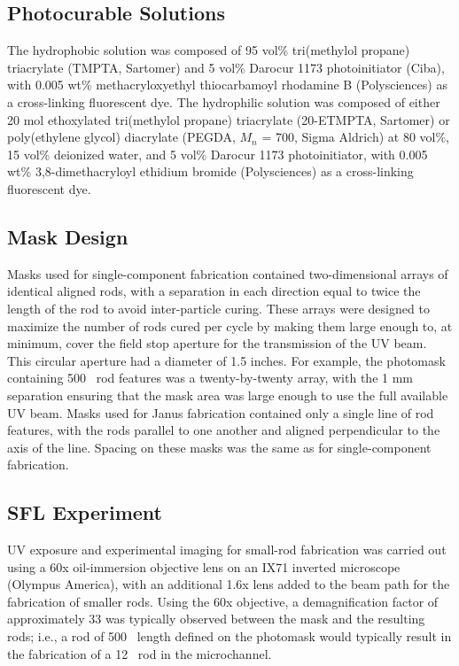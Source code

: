 \subsection{Photocurable Solutions}
\label{sec:janus-materials}
The hydrophobic solution was composed of 95 vol\% 
tri(methylol propane) triacrylate (TMPTA, Sartomer) and 5 vol\% Darocur 1173 photoinitiator (Ciba), 
with 0.005 wt\% methacryloxyethyl thiocarbamoyl rhodamine B (Polysciences) as a cross-linking 
fluorescent dye.
The hydrophilic solution was composed of either 20 mol ethoxylated tri(methylol propane) triacrylate (20-ETMPTA,
Sartomer) or poly(ethylene glycol) diacrylate (PEGDA, $M_n$ = 700, Sigma Aldrich) at 80 vol\%, 
15 vol\% deionized water, and 5 vol\% Darocur 1173 photoinitiator, with 0.005 wt\% 
3,8-dimethacryloyl ethidium bromide (Polysciences) as a cross-linking fluorescent dye.


\subsection{Mask Design}

Masks used for single-component fabrication contained two-dimensional arrays of identical aligned 
rods, with a separation in each direction equal to twice the length of the rod to avoid inter-particle
curing. These arrays were designed to maximize the number of 
rods cured per cycle by making them large enough to, at minimum,
cover the field stop aperture for the transmission of the UV beam. This circular aperture 
had a diameter of 1.5 inches.  For example, the photomask containing 500 \microns~rod features
was a twenty-by-twenty array, with the 1 mm separation ensuring that the mask area was large enough to
use the full available UV beam.  
Masks used for Janus fabrication contained only a single line of rod features, with the rods parallel to one 
another and aligned perpendicular to the axis of the line.  Spacing on these 
masks was the same as for single-component fabrication.


\subsection{SFL Experiment}
\label{sec:sfl-expt-rods}

UV exposure and experimental imaging for small-rod fabrication was carried out using a 60x 
oil-immersion objective lens 
on an IX71 inverted microscope (Olympus America), with an additional 1.6x lens added to the beam path for
the fabrication of smaller rods.  Using the 60x objective, a demagnification factor of approximately 
33 was typically observed between the mask and the resulting rods; i.e., a rod of 500 \microns~length defined on
the photomask would typically result in the fabrication of a 12 \microns~rod in the microchannel.

